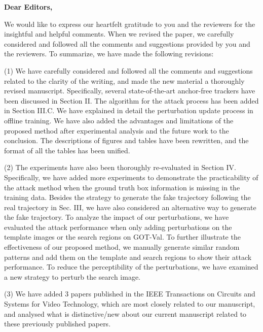 \addtolength{\voffset}{-0.5in}
\addtolength{\hoffset}{-0.3in}
\addtolength{\textheight}{2cm}

\signature{Zhenbang Li, Yaya Shi, Jin Gao$^*$, Shaoru Wang, Bing Li, Pengpeng Liang, Weiming Hu}
            
\begin{letter}{}
\opening{\textbf{Dear Editors,}}

We would like to express our heartfelt gratitude to you and the reviewers for the insightful and helpful comments. When we revised the paper, we carefully considered and followed all the comments and suggestions provided by you and the reviewers. To summarize, we have made the following revisions:

(1) We have carefully considered and followed all the comments and suggestions related to the clarity of the writing, and made the new material a thoroughly revised manuscript. Specifically, several state-of-the-art anchor-free trackers have been discussed in Section II. The algorithm for the attack process has been added in Section III.C. We have explained in detail the perturbation update process in offline training. We have also added the advantages and limitations of the proposed method after experimental analysis and the future work to the conclusion. The descriptions of figures and tables have been rewritten, and the format of all the tables has been unified.

(2) The experiments have also been thoroughly re-evaluated in Section IV. Specifically, we have added more experiments to demonstrate the practicability of the attack method when the ground truth box information is missing in the training data. Besides the strategy to generate the fake trajectory following the real trajectory in Sec. III, we have also considered an alternative way to generate the fake trajectory. To analyze the impact of our perturbations, we have evaluated the attack performance when only adding perturbations on the template images or the search regions on GOT-Val. To further illustrate the effectiveness of our proposed method, we manually generate similar random patterns and add them on the template and search regions to show their attack performance. To reduce the perceptibility of the perturbations, we have examined a new strategy to perturb the search image.

(3) We have added 3 papers published in the IEEE Transactions on Circuits and Systems for Video Technology, which are most closely related to our manuscript, and analysed what is distinctive/new about our current manuscript related to these previously published papers.


\end{letter}
